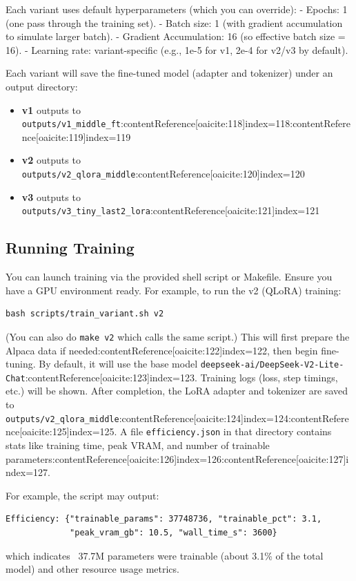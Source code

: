 \documentclass{article}
\begin{document}
Each variant uses default hyperparameters (which you can override):
- Epochs: 1 (one pass through the training set).
- Batch size: 1 (with gradient accumulation to simulate larger batch).
- Gradient Accumulation: 16 (so effective batch size = 16).
- Learning rate: variant-specific (e.g., 1e-5 for v1, 2e-4 for v2/v3 by default).

Each variant will save the fine-tuned model (adapter and tokenizer) under an output directory:
\begin{itemize}
    \item \textbf{v1} outputs to \texttt{outputs/v1\_middle\_ft}:contentReference[oaicite:118]{index=118}:contentReference[oaicite:119]{index=119}
    \item \textbf{v2} outputs to \texttt{outputs/v2\_qlora\_middle}:contentReference[oaicite:120]{index=120}
    \item \textbf{v3} outputs to \texttt{outputs/v3\_tiny\_last2\_lora}:contentReference[oaicite:121]{index=121}
\end{itemize}

\subsection{Running Training}
You can launch training via the provided shell script or Makefile. Ensure you have a GPU environment ready. For example, to run the v2 (QLoRA) training:
\begin{verbatim}
bash scripts/train_variant.sh v2
\end{verbatim}
(You can also do \texttt{make v2} which calls the same script.) This will first prepare the Alpaca data if needed:contentReference[oaicite:122]{index=122}, then begin fine-tuning. By default, it will use the base model \texttt{deepseek-ai/DeepSeek-V2-Lite-Chat}:contentReference[oaicite:123]{index=123}. Training logs (loss, step timings, etc.) will be shown. After completion, the LoRA adapter and tokenizer are saved to \texttt{outputs/v2\_qlora\_middle}:contentReference[oaicite:124]{index=124}:contentReference[oaicite:125]{index=125}. A file \texttt{efficiency.json} in that directory contains stats like training time, peak VRAM, and number of trainable parameters:contentReference[oaicite:126]{index=126}:contentReference[oaicite:127]{index=127}.

For example, the script may output:
\begin{verbatim}
Efficiency: {"trainable_params": 37748736, "trainable_pct": 3.1,
             "peak_vram_gb": 10.5, "wall_time_s": 3600}
\end{verbatim}
which indicates ~37.7M parameters were trainable (about 3.1\% of the total model) and other resource usage metrics.
\end{document}
